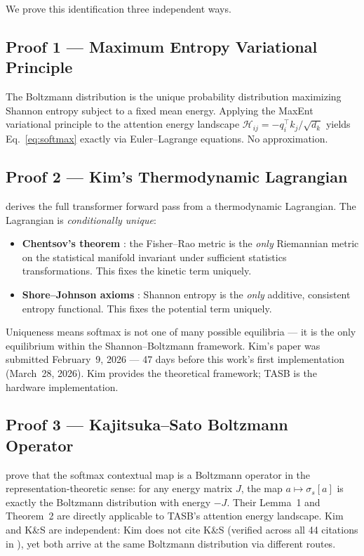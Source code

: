 \documentclass[11pt,a4paper]{article}
\begin{document}
We prove this identification three independent ways.

\subsection{Proof 1 --- Maximum Entropy Variational Principle}

The Boltzmann distribution is the unique probability distribution maximizing
Shannon entropy subject to a fixed mean energy. Applying the MaxEnt variational
principle to the attention energy landscape $\mathcal{H}_{ij} = -q_i^\top k_j /
\sqrt{d_k}$ yields Eq.~\eqref{eq:softmax} exactly via Euler--Lagrange equations.
No approximation.

\subsection{Proof 2 --- Kim's Thermodynamic Lagrangian}

\citet{kim2026thermodynamic} derives the full transformer forward pass from a
thermodynamic Lagrangian. The Lagrangian is \emph{conditionally unique}:

\begin{itemize}[nosep]
  \item \textbf{Chentsov's theorem} \citep{chentsov1982statistical}: the Fisher--Rao
    metric is the \emph{only} Riemannian metric on the statistical manifold invariant
    under sufficient statistics transformations. This fixes the kinetic term uniquely.
  \item \textbf{Shore--Johnson axioms} \citep{shore1980axiomatic}: Shannon entropy is
    the \emph{only} additive, consistent entropy functional. This fixes the potential
    term uniquely.
\end{itemize}

Uniqueness means softmax is not one of many possible equilibria --- it is the only
equilibrium within the Shannon--Boltzmann framework. Kim's paper was submitted
February~9, 2026 --- 47 days before this work's first implementation (March~28, 2026).
Kim provides the theoretical framework; TASB is the hardware implementation.

\subsection{Proof 3 --- Kajitsuka--Sato Boltzmann Operator}

\citet{kajitsuka2024transformers} prove that the softmax contextual map is a
Boltzmann operator in the representation-theoretic sense: for any energy matrix
$J$, the map $a \mapsto \sigma_s[a]$ is exactly the Boltzmann distribution with
energy $-J$. Their Lemma~1 and Theorem~2 are directly applicable to TASB's
attention energy landscape. Kim and K\&S are independent: Kim does not cite K\&S
(verified across all 44 citations in \citep{kim2026thermodynamic}), yet both
arrive at the same Boltzmann distribution via different routes.
\end{document}
